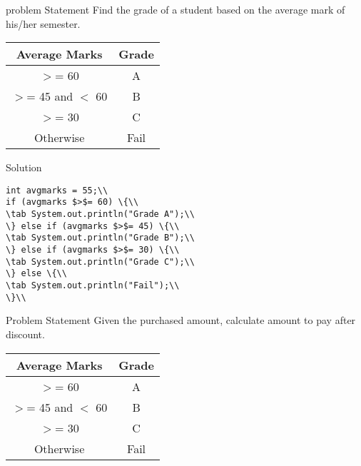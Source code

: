 \documentclass[aspectratio=169,14pt,usenames,dvipsnames]{beamer}
\newcommand\tab[1][1cm]{\hspace*{#1}}
\begin{document}
\begin{frame}{problem Statement}
Find the grade of a student based on the
average mark of his/her semester.
\begin{center}
\begin{tabular}{|c|c|}
\hline 
\textbf{Average Marks} & \textbf{Grade}\\
\hline
$>$= 60 & A\\
\hline
$>$= 45 and $<$ 60 & B\\
\hline
$>$= 30 & C\\
\hline
Otherwise & Fail\\
\hline
\end{tabular}
\end{center}
\end{frame}
    


\begin{frame}{Solution}
\begin{lstlisting}
int avgmarks = 55;\\
if (avgmarks $>$= 60) \{\\
\tab System.out.println("Grade A");\\
\} else if (avgmarks $>$= 45) \{\\
\tab System.out.println("Grade B");\\
\} else if (avgmarks $>$= 30) \{\\
\tab System.out.println("Grade C");\\
\} else \{\\
\tab System.out.println("Fail");\\
\}\\
\end{lstlisting}
\end{frame}

\begin{frame}{Problem Statement}
Given the purchased amount, calculate
amount to pay after discount.\\
\begin{center}
\begin{tabular}{|c|c|}
\hline 
\textbf{Average Marks} & \textbf{Grade}\\
\hline
$>$= 60 & A\\
\hline
$>$= 45 and $<$ 60 & B\\
\hline
$>$= 30 & C\\
\hline
Otherwise & Fail\\
\hline
\end{tabular}
\end{center}
\end{frame}
\end{document}
